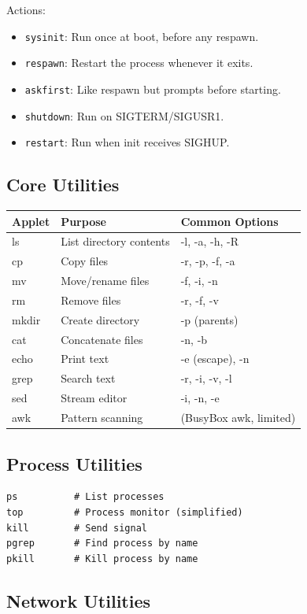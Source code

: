 Actions:
\begin{itemize}[nosep]
  \item \texttt{sysinit}: Run once at boot, before any respawn.
  \item \texttt{respawn}: Restart the process whenever it exits.
  \item \texttt{askfirst}: Like respawn but prompts before starting.
  \item \texttt{shutdown}: Run on SIGTERM/SIGUSR1.
  \item \texttt{restart}: Run when init receives SIGHUP.
\end{itemize}

\subsection{Core Utilities}

\begin{longtable}{|p{3cm}|p{4cm}|p{5cm}|}
\hline
\textbf{Applet} & \textbf{Purpose} & \textbf{Common Options} \\
\hline
ls & List directory contents & -l, -a, -h, -R \\
cp & Copy files & -r, -p, -f, -a \\
mv & Move/rename files & -f, -i, -n \\
rm & Remove files & -r, -f, -v \\
mkdir & Create directory & -p (parents) \\
cat & Concatenate files & -n, -b \\
echo & Print text & -e (escape), -n \\
grep & Search text & -r, -i, -v, -l \\
sed & Stream editor & -i, -n, -e \\
awk & Pattern scanning & (BusyBox awk, limited) \\
\hline
\end{longtable}

\subsection{Process Utilities}

\begin{lstlisting}
ps          # List processes
top         # Process monitor (simplified)
kill        # Send signal
pgrep       # Find process by name
pkill       # Kill process by name
\end{lstlisting}

\subsection{Network Utilities}

